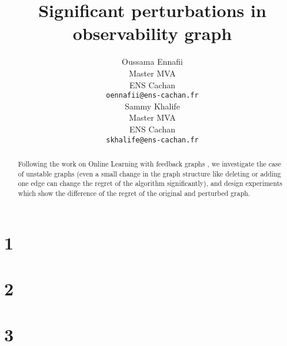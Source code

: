 \documentclass{article} %
\title{Significant perturbations in observability graph}
\author{
Oussama Ennafii\\
Master MVA\\
ENS Cachan\\
\texttt{oennafii@ens-cachan.fr} \\
\And
Sammy Khalife \\
Master MVA\\
ENS Cachan\\
\texttt{skhalife@ens-cachan.fr}
}
\begin{document}
\maketitle

\begin{abstract}
Following the work on Online Learning with feedback graphs \cite{journals/corr/AlonCDK15} ,
we investigate the case of unstable graphs (even a small change in the graph structure like deleting or adding one edge can change the regret of the algorithm significantly), and design experiments which show the difference of the regret of the original and perturbed graph.
\end{abstract}

\section*{1 }

\section*{2 }
\section*{3 }



\end{document}
